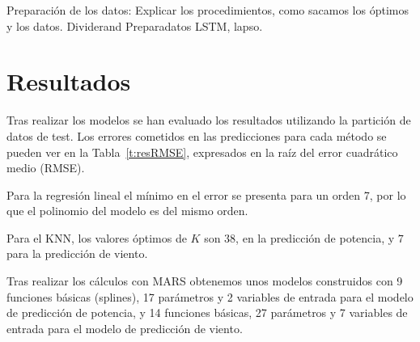 \documentclass[journal]{IEEEtran}
\begin{document}
Preparación de los datos:
Explicar los procedimientos, como sacamos los óptimos y los datos.
Dividerand
Preparadatos LSTM, lapso.
%
%

\section{Resultados} 
Tras realizar los modelos se han evaluado los resultados utilizando la partición de datos de test. Los errores cometidos en las predicciones para cada método se pueden ver en la Tabla~\ref{t:resRMSE}, expresados en la raíz del error cuadrático medio (RMSE).

Para la regresión lineal el mínimo en el error se presenta para un orden 7, por lo que el polinomio del modelo es del mismo orden.

Para el KNN, los valores óptimos de $K$ son $38$, en la predicción de potencia, y $7$ para la predicción de viento.

Tras realizar los cálculos con MARS obtenemos unos modelos construidos con 9 funciones básicas (splines), 17 parámetros  y 2 variables de entrada para el modelo de predicción de potencia, y 14 funciones básicas, 27 parámetros y 7 variables de entrada para el modelo de predicción de viento.
\end{document}
